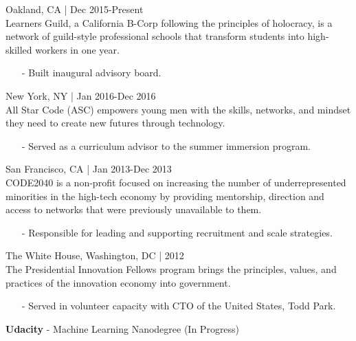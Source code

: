 \documentclass[11pt,article,oneside]{memoir}
\begin{document}
 \hfill Oakland, CA | Dec 2015-Present\\
Learners Guild, a California B-Corp following the principles of holocracy, is a network of guild-style professional schools that transform students into high-skilled workers in one year.
\begin{itemize}[noitemsep,nolistsep]
\item[-] Built inaugural advisory board.
\end{itemize}

 \hfill New York, NY | Jan 2016-Dec 2016\\
All Star Code (ASC) empowers young men with the skills, networks, and mindset they need to create new futures through technology. 
\begin{itemize}[noitemsep,nolistsep]
\item[-] Served as a curriculum advisor to the summer immersion program.
\end{itemize}

 \hfill San Francisco, CA | Jan 2013-Dec 2013\\
CODE2040 is a non-profit focused on increasing the number of underrepresented minorities in the high-tech economy by providing mentorship, direction and access to networks that were previously unavailable to them.
\begin{itemize}[nolistsep]
\item[-] Responsible for leading and supporting recruitment and scale strategies.
\end{itemize} 

 \hfill The White House, Washington, DC | 2012\\
The Presidential Innovation Fellows program brings the principles, values, and practices of the innovation economy into government.
\begin{itemize}[nolistsep]
\item[-] Served in volunteer capacity with CTO of the United States, Todd Park.
\end{itemize} 

\bigskip
\bigskip




\ind \textbf{Udacity} - Machine Learning Nanodegree  \hfill (In Progress)
\end{document}
